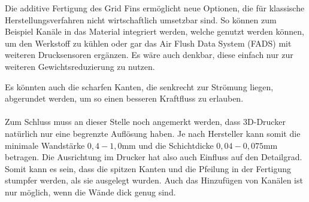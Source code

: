 Die additive Fertigung des Grid Fins ermöglicht neue Optionen, die für klassische Herstellungsverfahren nicht wirtschaftlich umsetzbar sind. So können zum Beispiel Kanäle in das Material integriert werden, welche genutzt werden können, um den Werkstoff zu kühlen oder gar das Air Flush Data System (FADS) mit weiteren Drucksensoren ergänzen. Es wäre auch denkbar, diese einfach nur zur weiteren Gewichtsreduzierung zu nutzen.

Es könnten auch die scharfen Kanten, die senkrecht zur Strömung liegen, abgerundet werden, um so einen besseren Kraftfluss zu erlauben.
\\~\\
Zum Schluss muss an dieser Stelle noch angemerkt werden, dass 3D-Drucker natürlich nur eine begrenzte Auflösung haben. Je nach Hersteller kann somit die minimale Wandstärke $0,4-1,0$mm \cite{eos, preise} und die Schichtdicke $0,04-0,075$mm \cite{preise} betragen. Die Ausrichtung im Drucker hat also auch Einfluss auf den Detailgrad. Somit kann es sein, dass die spitzen Kanten und die Pfeilung in der Fertigung stumpfer werden, als sie ausgelegt wurden. Auch das Hinzufügen von Kanälen ist nur möglich, wenn die Wände dick genug sind.
